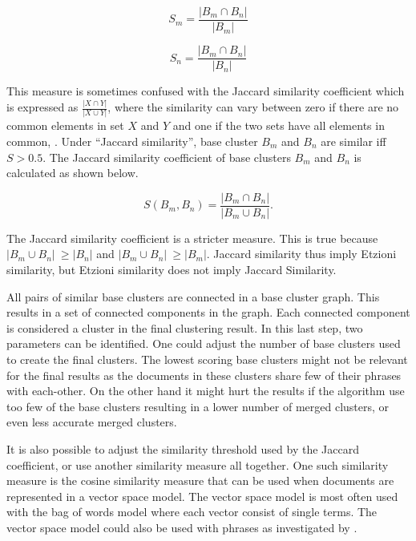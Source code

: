 \begin{displaymath} 
S_{m} = 
\frac{\vert B_{m} \cap B_{n} \vert} {\vert B_{m} \vert}
\end{displaymath}

\begin{displaymath} 
S_{n} = 
\frac{\vert B_{m} \cap B_{n} \vert} {\vert B_{n} \vert}
\end{displaymath}

This measure is sometimes confused with the Jaccard similarity coefficient which is expressed as 
\begin{math}
\frac{\vert X \cap Y \vert} {\vert X \cup Y \vert}
\end{math}, where the similarity can vary between zero if there are no common elements in set \(X\) and \(Y\) and one if the two sets have all elements in common, \cite{VanRijsbergen1979}. Under ``Jaccard similarity'', base cluster \(B_{m}\) and \(B_{n}\) are similar iff \(S > 0.5\). The Jaccard similarity coefficient of base clusters \(B_{m}\) and \(B_{n}\) is calculated as shown below.

\begin{displaymath} 
S(B_{m}, B_{n}) = 
\frac{\vert B_{m} \cap B_{n} \vert} {\vert B_{m} \cup B_{n} \vert}.
\end{displaymath}

The Jaccard similarity coefficient is a stricter measure. This is true because \(\vert B_{m} \cup B_{n} \vert\ \geq \vert B_{n} \vert\) and \(\vert B_{m} \cup B_{n} \vert\ \geq \vert B_{m} \vert\). Jaccard similarity thus imply Etzioni similarity, but Etzioni similarity does not imply Jaccard Similarity.

All pairs of similar base clusters are connected in a base cluster graph. This results in a set of connected components in the graph. Each connected component is considered a cluster in the final clustering result. In this last step, two parameters can be identified. One could adjust the number of base clusters used to create the final clusters. The lowest scoring base clusters might not be relevant for the final results as the documents in these clusters share few of their phrases with each-other. On the other hand it might hurt the results if the algorithm use too few of the base clusters resulting in a lower number of merged clusters, or even less accurate merged clusters.

It is also possible to adjust the similarity threshold used by the Jaccard coefficient, or use another similarity measure all together. One such similarity measure is the cosine similarity measure that can be used when documents are represented in a vector space model. The vector space model is most often used with the bag of words model where each vector consist of single terms. The vector space model could also be used with phrases as investigated by \cite{Chim2007}.

